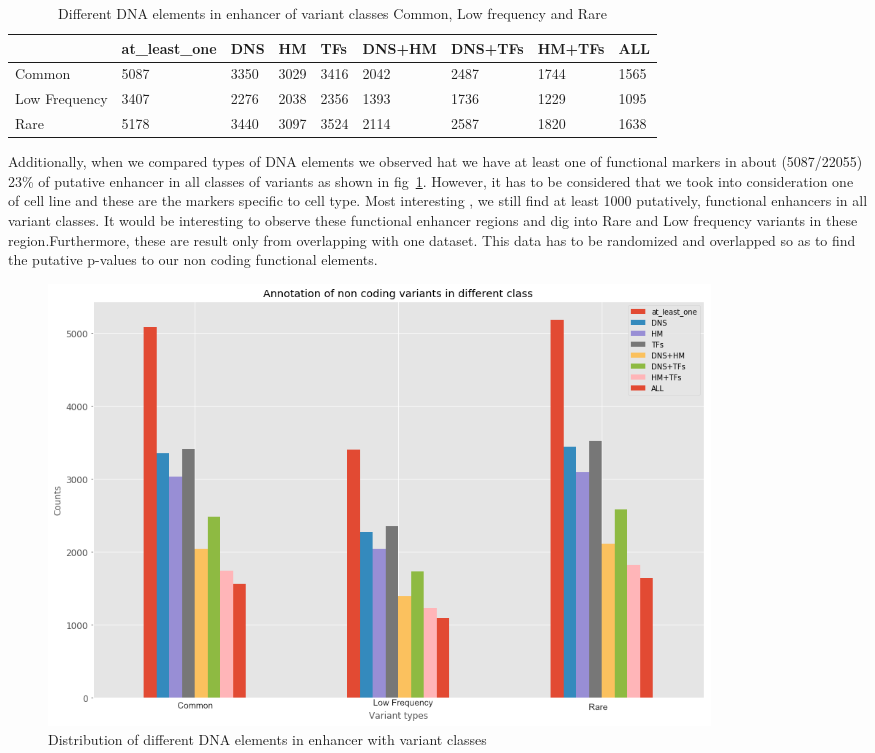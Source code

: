 \documentclass[10pt]{article} %
\begin{document}
\begin{table}[H]
\centering
\begin{tabular}{@{}lllllllll@{}}
\toprule
\rowcolor[HTML]{BBDAFF} 
\multicolumn{1}{c}{\cellcolor[HTML]{BBDAFF}{\color[HTML]{333333} class}} & {\color[HTML]{333333} at\_least\_one} & {\color[HTML]{333333} DNS} & {\color[HTML]{333333} HM} & {\color[HTML]{333333} TFs} & {\color[HTML]{333333} DNS+HM} & {\color[HTML]{333333} DNS+TFs} & {\color[HTML]{333333} HM+TFs} & {\color[HTML]{333333} ALL} \\ \midrule
\cellcolor[HTML]{FFFFFF}Common & 5087 & 3350 & 3029 & 3416 & 2042 & 2487 & 1744 & 1565 \\
\cellcolor[HTML]{FFFFFF}Low Frequency & 3407 & 2276 & 2038 & 2356 & 1393 & 1736 & 1229 & 1095 \\
\cellcolor[HTML]{FFFFFF}Rare & 5178 & 3440 & 3097 & 3524 & 2114 & 2587 & 1820 & 1638 \\ \bottomrule
\end{tabular}
\caption{\small Different DNA elements in enhancer of variant classes Common, Low frequency and Rare}
\label{table3}
\end{table}

Additionally, when we compared types of DNA elements we observed hat we have at least one of functional markers in about (5087/22055) 23\% of putative enhancer in all classes of variants as shown in fig~\ref{fig3}. However, it has to be considered that we took into consideration one of cell line and these are the markers specific to cell type. Most interesting , we still find at least 1000 putatively, functional enhancers in all variant classes. It would be interesting to observe these functional enhancer regions and dig into Rare and Low frequency variants in these region.Furthermore, these are result only from overlapping with one dataset. This data has to be randomized and overlapped so as to find the putative p-values to our non coding functional elements.


\begin{figure}[H]
\centering
\includegraphics[width=0.85\textwidth]{Enhancer_elements.png}
\caption{\small Distribution of different DNA elements in enhancer with variant classes}
\label{fig3}
\end{figure}
\end{document}

